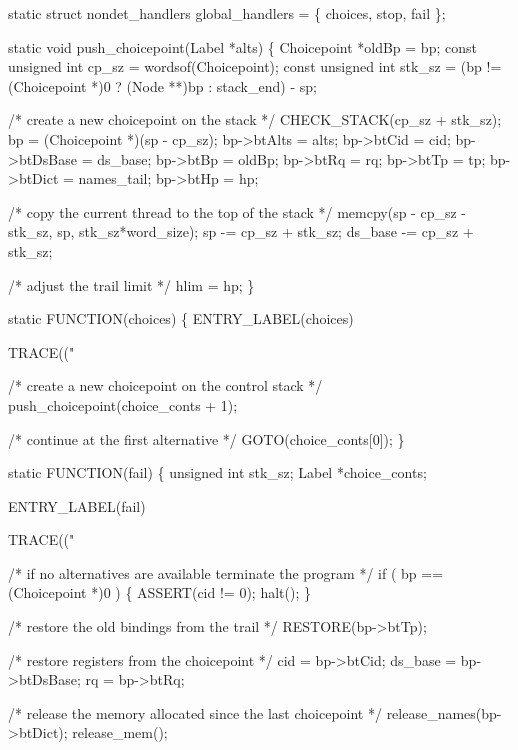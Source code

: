 \nwenddocs{}\plusendmoddef\nwstartdeflinemarkup{}\nwenddeflinemarkup
static struct nondet_handlers global_handlers = \{ choices, stop, fail \};

static void
push_choicepoint(Label *alts)
\{
    Choicepoint        *oldBp = bp;
    const unsigned int cp_sz  = wordsof(Choicepoint);
    const unsigned int stk_sz =
        (bp != (Choicepoint *)0 ? (Node **)bp : stack_end) - sp;

    /* create a new choicepoint on the stack */
    CHECK_STACK(cp_sz + stk_sz);
    bp           = (Choicepoint *)(sp - cp_sz);
    bp->btAlts   = alts;
    bp->btCid    = cid;
    bp->btDsBase = ds_base;
    bp->btBp     = oldBp;
    bp->btRq     = rq;
    bp->btTp     = tp;
    bp->btDict   = names_tail;
    bp->btHp     = hp;

    /* copy the current thread to the top of the stack */
    memcpy(sp - cp_sz - stk_sz, sp, stk_sz*word_size);
    sp      -= cp_sz + stk_sz;
    ds_base -= cp_sz + stk_sz;

    /* adjust the trail limit */
    hlim = hp;
\}

static
FUNCTION(choices)
\{
 ENTRY_LABEL(choices)

    TRACE(("%

    /* create a new choicepoint on the control stack */
    push_choicepoint(choice_conts + 1);

    /* continue at the first alternative */
    GOTO(choice_conts[0]);
\}

static
FUNCTION(fail)
\{
    unsigned int stk_sz;
    Label        *choice_conts;

 ENTRY_LABEL(fail)

    TRACE(("%

    /* if no alternatives are available terminate the program */
    if ( bp == (Choicepoint *)0 )
    \{
        ASSERT(cid != 0);
        halt();
    \}

    /* restore the old bindings from the trail */
    RESTORE(bp->btTp);

    /* restore registers from the choicepoint */
    cid     = bp->btCid;
    ds_base = bp->btDsBase;
    rq      = bp->btRq;

    /* release the memory allocated since the last choicepoint */
    release_names(bp->btDict);
    release_mem();


